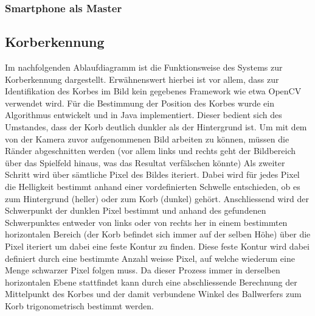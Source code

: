 \subsubsection{Smartphone als Master}
	
	
	\subsection{Korberkennung}
	Im nachfolgenden Ablaufdiagramm ist die Funktionsweise des Systems zur Korberkennung dargestellt. Erwähnenswert hierbei ist vor allem, dass zur Identifikation des Korbes im Bild kein gegebenes Framework wie etwa OpenCV verwendet wird.
	Für die Bestimmung der Position des Korbes wurde ein Algorithmus entwickelt und in Java implementiert. Dieser bedient sich des Umstandes, dass der Korb deutlich dunkler als der Hintergrund ist. Um mit dem von der Kamera zuvor aufgenommenen Bild arbeiten zu können, müssen die Ränder abgeschnitten werden (vor allem links und rechts geht der Bildbereich über das Spielfeld hinaus, was das Resultat verfälschen könnte) Als zweiter Schritt wird über sämtliche Pixel des Bildes iteriert. Dabei wird für jedes Pixel die Helligkeit bestimmt anhand einer vordefinierten Schwelle entschieden, ob es zum Hintergrund (heller) oder zum Korb (dunkel) gehört. Anschliessend wird der Schwerpunkt der dunklen Pixel bestimmt und anhand des gefundenen Schwerpunktes entweder von links oder von rechts her in einem bestimmten horizontalen Bereich (der Korb befindet sich immer auf der selben Höhe) über die Pixel iteriert um dabei eine feste Kontur zu finden. Diese feste Kontur wird dabei definiert durch eine bestimmte Anzahl weisse Pixel, auf welche wiederum eine Menge schwarzer Pixel folgen muss. Da dieser Prozess immer in derselben horizontalen Ebene stattfindet kann durch eine abschliessende Berechnung der Mittelpunkt des Korbes und der damit verbundene Winkel des Ballwerfers zum Korb trigonometrisch bestimmt werden.
	